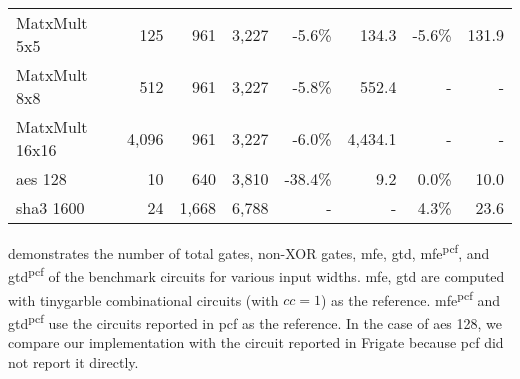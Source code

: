 \begin{table}
{\begin{tabular}{l||rrr||rr||rr}
MatxMult 5x5              & 125                   & 961                         & 3,227                            & -5.6\%                                   & 134.3                                    & -5.6\%                                        & 131.9                                         \\
MatxMult 8x8              & 512                   & 961                         & 3,227                            & -5.8\%                                   & 552.4                                    & -                                             & -                                             \\
MatxMult 16x16            & 4,096                 & 961                         & 3,227                            & -6.0\%                                   & 4,434.1                                  & -                                             & -                                             \\ \hline
\acrshort{aes} 128                   & 10                    & 640                         & 3,810                            & -38.4\%                                    & 9.2                                     & 0.0\%                                         & 10.0                                          \\ \hline
\acrshort{sha}3 1600                 & 24                    & 1,668                       & 6,788                            & -                                        & -                                        & 4.3\%                                         & 23.6
\end{tabular}
}
\end{table}

 demonstrates the number of total gates, non-XOR gates, \acrshort{mfe}, \acrshort{gtd}, \acrshort{mfe}\textsuperscript{\gls{pcf}}, and \acrshort{gtd}\textsuperscript{\gls{pcf}} of the benchmark circuits for various input widths.
\acrshort{mfe}, \acrshort{gtd} are computed with \gls{tinygarble} combinational circuits (with $cc=1$) as the reference.
\acrshort{mfe}\textsuperscript{\gls{pcf}} and \acrshort{gtd}\textsuperscript{\gls{pcf}} use the circuits reported in \gls{pcf} as the reference.
In the case of \acrshort{aes} 128, we compare our implementation with the circuit reported in Frigate \cite{mood2016frigate} because \gls{pcf} did not report it directly.


